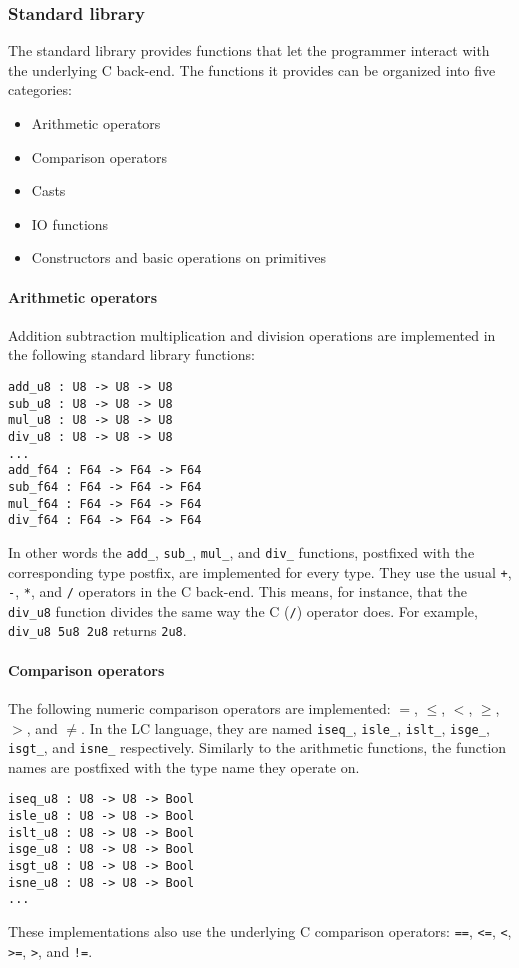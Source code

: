 \documentclass[12pt]{article}
\begin{document}
\subsubsection{Standard library}

The standard library provides functions that let the programmer interact with
the underlying C back-end. The functions it provides can be organized into five
categories:
\begin{itemize}
    \item Arithmetic operators
    \item Comparison operators
    \item Casts
    \item IO functions
    \item Constructors and basic operations on primitives
\end{itemize}

\paragraph{Arithmetic operators} Addition subtraction multiplication and
division operations are implemented in the following standard library functions:
\begin{lstlisting}
add_u8 : U8 -> U8 -> U8
sub_u8 : U8 -> U8 -> U8
mul_u8 : U8 -> U8 -> U8
div_u8 : U8 -> U8 -> U8
...
add_f64 : F64 -> F64 -> F64
sub_f64 : F64 -> F64 -> F64
mul_f64 : F64 -> F64 -> F64
div_f64 : F64 -> F64 -> F64
\end{lstlisting}
In other words the \verb$add_$, \verb$sub_$, \verb$mul_$, and \verb$div_$
functions, postfixed with the corresponding type postfix, are implemented for
every type. They use the usual \verb$+$, \verb$-$, \verb$*$, and \verb$/$
operators in the C back-end. This means, for instance, that the \verb$div_u8$
function divides the same way the C (\verb$/$) operator does. For example,
\verb$div_u8 5u8 2u8$ returns \verb$2u8$.

\paragraph{Comparison operators} The following numeric comparison operators are
implemented: $=$, $\le$, $<$, $\ge$, $>$, and $\ne$. In the LC language, they
are named \verb$iseq_$, \verb$isle_$, \verb$islt_$, \verb$isge_$, \verb$isgt_$,
and \verb$isne_$ respectively. Similarly to the arithmetic functions, the
function names are postfixed with the type name they operate on.
\begin{lstlisting}
iseq_u8 : U8 -> U8 -> Bool
isle_u8 : U8 -> U8 -> Bool
islt_u8 : U8 -> U8 -> Bool
isge_u8 : U8 -> U8 -> Bool
isgt_u8 : U8 -> U8 -> Bool
isne_u8 : U8 -> U8 -> Bool
...
\end{lstlisting}
These implementations also use the underlying C comparison operators: \verb$==$,
\verb$<=$, \verb$<$, \verb$>=$, \verb$>$, and \verb$!=$.
\end{document}
